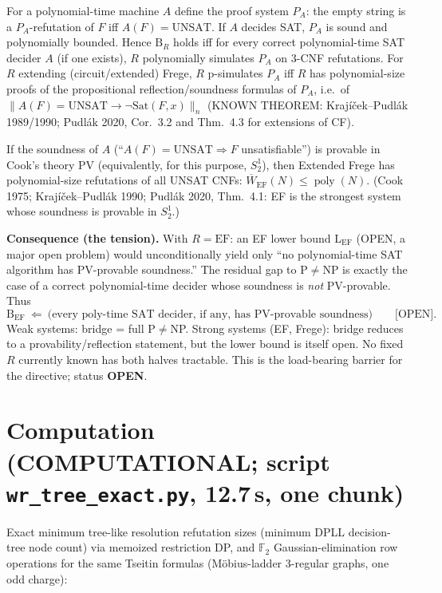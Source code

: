 \documentclass[11pt]{article}
\begin{document}
\begin{proposition}
For a polynomial-time machine $A$ define the proof system $P_A$: the empty string is a $P_A$-refutation of
$F$ iff $A(F)=\mathrm{UNSAT}$. If $A$ decides SAT, $P_A$ is sound and polynomially bounded. Hence
$\mathrm B_R$ holds iff for every correct polynomial-time SAT decider $A$ (if one exists), $R$ polynomially
simulates $P_A$ on 3-CNF refutations. For $R$ extending (circuit/extended) Frege, $R$ p-simulates $P_A$ iff $R$ has
polynomial-size proofs of the propositional reflection/soundness formulas of $P_A$, i.e.\ of
$\|A(F)=\mathrm{UNSAT}\rightarrow \neg\mathrm{Sat}(F,x)\|_n$ (KNOWN THEOREM: Krajíček--Pudlák 1989/1990;
Pudlák 2020, Cor.~3.2 and Thm.~4.3 for extensions of CF).
\end{proposition}

\begin{proposition}
If the soundness of $A$ (``$A(F)=\mathrm{UNSAT}\Rightarrow F$ unsatisfiable'') is provable in Cook's theory PV
(equivalently, for this purpose, $S^1_2$), then Extended Frege has polynomial-size refutations of all UNSAT
CNFs: $\overline W_{\mathrm{EF}}(N)\le\operatorname{poly}(N)$. (Cook 1975; Krajíček--Pudlák 1990; Pudlák 2020,
Thm.~4.1: EF is the strongest system whose soundness is provable in $S^1_2$.)
\end{proposition}
\noindent\textbf{Consequence (the tension).} With $R=\mathrm{EF}$:
an EF lower bound $\mathrm L_{\mathrm{EF}}$ (OPEN, a major open problem) would unconditionally yield only
``no polynomial-time SAT algorithm has PV-provable soundness.'' The residual gap to P$\ne$NP is exactly the case of a
correct polynomial-time decider whose soundness is \emph{not} PV-provable. Thus
\[
\mathrm B_{\mathrm{EF}}\ \Longleftarrow\ \text{(every poly-time SAT decider, if any, has PV-provable soundness)}\qquad\text{[OPEN]}.
\]
Weak systems: bridge = full P$\ne$NP. Strong systems (EF, Frege): bridge reduces to a provability/reflection
statement, but the lower bound is itself open. No fixed $R$ currently known has both halves tractable.
This is the load-bearing barrier for the directive; status \textbf{OPEN}.

\section{Computation (COMPUTATIONAL; script \texttt{wr\_tree\_exact.py}, 12.7\,s, one chunk)}
Exact minimum tree-like resolution refutation sizes (minimum DPLL decision-tree node count) via memoized
restriction DP, and $\mathbb F_2$ Gaussian-elimination row operations for the same Tseitin formulas
(Möbius-ladder 3-regular graphs, one odd charge):
\end{document}
